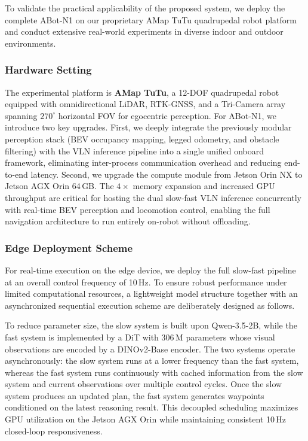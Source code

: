 To validate the practical applicability of the proposed system, we deploy
the complete ABot-N1 on our proprietary AMap TuTu
quadrupedal robot platform and conduct extensive real-world experiments
in diverse indoor and outdoor environments.

\subsubsection{Hardware Setting}
\label{sec:exp-hw}

The experimental platform is \textbf{AMap TuTu}, a 12-DOF quadrupedal robot equipped with omnidirectional LiDAR, RTK-GNSS, and a Tri-Camera array spanning $270^{\circ}$ horizontal FOV for egocentric perception. 
For ABot-N1, we introduce two key upgrades.
First, we deeply integrate the previously modular perception stack (BEV occupancy mapping, legged odometry, and obstacle filtering) with the VLN inference pipeline into a single unified onboard
framework, eliminating inter-process communication overhead and
reducing end-to-end latency.
Second, we upgrade the compute module from Jetson Orin NX to
Jetson AGX Orin 64\,GB. The $4\times$ memory
expansion and increased GPU throughput are critical for hosting the
dual slow-fast VLN inference concurrently with real-time BEV
perception and locomotion control, enabling the full
navigation architecture to run entirely on-robot without offloading.

\subsubsection{Edge Deployment Scheme}
\label{sec:exp-deploy}

For real-time execution on the edge device, we deploy the full
slow-fast pipeline at an overall control frequency of 10\,Hz.
To ensure robust performance under limited computational resources,
a lightweight model structure together with an asynchronized
sequential execution scheme are deliberately designed as follows.

To reduce parameter size, the slow system is built upon
Qwen-3.5-2B, while the fast system is implemented by a DiT with
306\,M parameters whose visual observations are encoded by a
DINOv2-Base encoder. The two systems operate asynchronously: the
slow system runs at a lower frequency than the fast system, whereas
the fast system runs continuously with cached information from the
slow system and current observations over multiple control cycles.
Once the slow system produces an updated plan, the fast system
generates waypoints conditioned on the latest reasoning result.
This decoupled scheduling maximizes GPU utilization on the Jetson AGX Orin
while maintaining consistent 10\,Hz closed-loop responsiveness.

